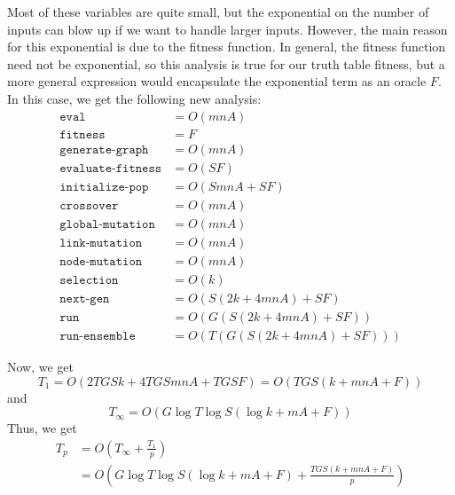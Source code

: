 \documentclass{article}
\begin{document}
	Most of these variables are quite small, but the exponential on the number of inputs can blow up if we want to handle larger inputs. However, the main reason for this exponential is due to the fitness function. In general, the fitness function need not be exponential, so this analysis is true for our truth table fitness, but a more general expression would encapsulate the exponential term as an oracle $F$. In this case, we get the following new analysis:
		\begin{align*}
	\texttt{eval} &= O(mnA) \\
	\texttt{fitness} &= F\\
	\texttt{generate-graph} &= O(mnA)\\
	\texttt{evaluate-fitness} &= O(SF)\\
	\texttt{initialize-pop} &= O(SmnA + SF)\\
	\texttt{crossover} &= O(mnA)\\
	\texttt{global-mutation} &= O(mnA)\\
	\texttt{link-mutation} &= O(mnA)\\
	\texttt{node-mutation} &= O(mnA)\\
	\texttt{selection} &= O(k) \\
	\texttt{next-gen} &= O(S(2k + 4mnA) + SF)\\
	\texttt{run} &= O(G(S(2k + 4mnA) + SF)) \\
	\texttt{run-ensemble} &= O(T(G(S(2k + 4mnA) + SF)))
	\end{align*}
	
	Now, we get $$T_1 = O(2TGSk + 4TGSmnA + TGSF) = O(TGS(k+mnA+F))$$ and $$T_\infty = O(G\log T\log S(\log k + mA + F))$$
	Thus, we get
	\begin{align*}
	T_p &= O\left(T_\infty + \frac{T_1}{p}\right) \\
	&= O\left(G\log T\log S(\log k + mA + F) + \frac{TGS(k+mnA+F)}{p}\right)
	\end{align*}
	
\end{document}
